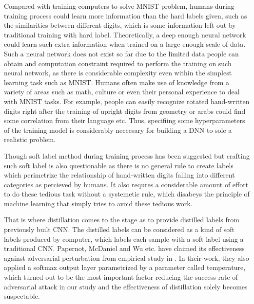 \documentclass{article}
\begin{document}
Compared with training computers to solve MNIST problem, humans during training process could learn more information than the hard labels given, such as the similarities between different digits, 
which is some information left out by traditional training with hard label. 
Theoretically, a deep enough neural network could learn such extra information when trained on a large enough scale of data. Such a neural network does not exist so far due to the limited data people can obtain and computation constraint required to perform the training on such neural network, as there is considerable complexity even within the simplest learning task such as MNIST. Humans often make use of knowledge from a variety of areas such as math, culture or even their personal experience to deal with MNIST tasks. For example, people can easily recognize rotated hand-written digits right after the training of upright digits from geometry or arabs could find some correlation from their language etc.
Thus, specifiing some hyperparameters of the training model is considerably neccesary for building a DNN to sole a realistic problem.

Though soft label method during training process has been suggested but crafting such soft label is also questionable as there is no general rule to create labels which perimetrize the relationship of hand-written digits falling into different categories as percieved by humans.
It also requres a considerable amount of effort to do these tedious task without a systemetic rule, which disabeys the principle of machine learning that simply tries to avoid these tedious work.

That is where distillation comes to the stage as to provide distilled labels from previously built CNN. The distilled labels can be considered as a kind of soft labels produced by computer, which labels each sample with a soft label using a traditional CNN. 
Papernot, McDaniel and Wu etc. have claimed its effectiveness against adversarial perturbation from empirical study in \cite{Papernot}.
In their work, they also applied a softmax output layer parametrized by a parameter called temperature, which turned out to be the most important factor reducing the success rate of adversarial attack in our study and the effectiveness of distillation solely becomes suspectable.
\end{document}
